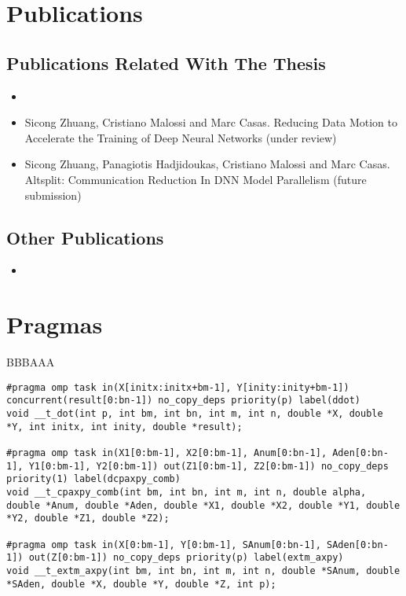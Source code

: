 \begin{appendices}
\chapter{Publications}
\section{Publications Related With The Thesis}
\begin{itemize}
	\item {}
	\item Sicong Zhuang, Cristiano Malossi and Marc Casas. Reducing Data Motion 
        to Accelerate the Training of Deep Neural Networks (under review)
	\item Sicong Zhuang, Panagiotis Hadjidoukas, Cristiano Malossi and Marc 
        Casas. Altsplit: Communication Reduction In DNN Model Parallelism 
        (future submission)
\end{itemize}

\section{Other Publications}
\begin{itemize}
    \item {}
\end{itemize}

\chapter{Pragmas}
BBBAAA
\begin{lstlisting}
#pragma omp task in(X[initx:initx+bm-1], Y[inity:inity+bm-1]) concurrent(result[0:bn-1]) no_copy_deps priority(p) label(ddot) 
void __t_dot(int p, int bm, int bn, int m, int n, double *X, double *Y, int initx, int inity, double *result); 

#pragma omp task in(X1[0:bm-1], X2[0:bm-1], Anum[0:bn-1], Aden[0:bn-1], Y1[0:bm-1], Y2[0:bm-1]) out(Z1[0:bm-1], Z2[0:bm-1]) no_copy_deps priority(1) label(dcpaxpy_comb)
void __t_cpaxpy_comb(int bm, int bn, int m, int n, double alpha, double *Anum, double *Aden, double *X1, double *X2, double *Y1, double *Y2, double *Z1, double *Z2);

#pragma omp task in(X[0:bm-1], Y[0:bm-1], SAnum[0:bn-1], SAden[0:bn-1]) out(Z[0:bm-1]) no_copy_deps priority(p) label(extm_axpy)
void __t_extm_axpy(int bm, int bn, int m, int n, double *SAnum, double *SAden, double *X, double *Y, double *Z, int p);


\end{lstlisting}
\end{appendices}
